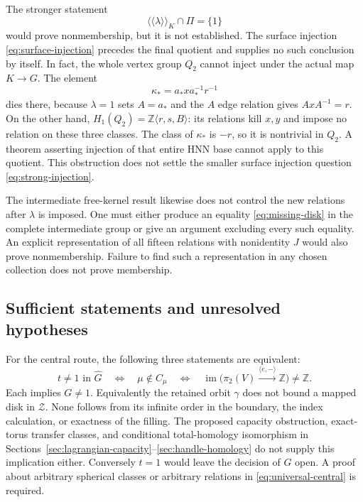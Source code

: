 \documentclass[11pt]{amsart}
\theoremstyle{definition}
\theoremstyle{remark}
\newcommand{\Z}{\mathbb Z}
\newcommand{\nc}[1]{\langle\!\langle #1\rangle\!\rangle}
\begin{document}
The stronger statement
\begin{equation}\label{eq:strong-injection}
                         \nc{\lambda}_K\cap\Pi=\{1\}
\end{equation}
would prove nonmembership, but it is not established. The surface
injection \eqref{eq:surface-injection} precedes the final quotient
and supplies no such conclusion by itself. In fact, the whole
vertex group $Q_2$ cannot inject under the actual map $K\to G$.
The element
\[
                         \kappa_*=a_*xa_*^{-1}r^{-1}
\]
dies there, because $\lambda=1$ sets $A=a_*$ and the $A$ edge
relation gives $AxA^{-1}=r$. On the other hand,
$H_1(Q_2)=\Z\langle r,s,B\rangle$: its relations kill $x,y$
and impose no relation on these three classes. The class of
$\kappa_*$ is $-r$, so it is nontrivial in $Q_2$. A theorem
asserting injection of that entire HNN base cannot apply to this
quotient. This obstruction does not settle the smaller surface
injection question \eqref{eq:strong-injection}.

The intermediate free-kernel result likewise does not control the
new relations after $\lambda$ is imposed. One must either produce
an equality \eqref{eq:missing-disk} in the complete intermediate
group or give an argument excluding every such equality. An explicit
representation of all fifteen relations with nonidentity $J$ would
also prove nonmembership. Failure to find such a representation in
any chosen collection does not prove membership.

\subsection*{Sufficient statements and unresolved hypotheses}
For the central route, the following three statements are equivalent:
\[
 t\ne1\text{ in }\widehat G
 \quad\Longleftrightarrow\quad \mu\notin C_\mu
 \quad\Longleftrightarrow\quad
 \operatorname{im}\bigl(\pi_2(V)\xrightarrow{\langle e,-\rangle}\Z\bigr)
                         \ne\Z.
\]
Each implies $G\ne1$. Equivalently the retained orbit $\gamma$ does
not bound a mapped disk in $\mathcal Z$. None follows from its
infinite order in the boundary, the index calculation, or exactness
of the filling. The proposed capacity obstruction, exact-torus
transfer classes, and conditional total-homology isomorphism in
Sections~\ref{sec:lagrangian-capacity}--\ref{sec:handle-homology}
do not supply this implication either.
Conversely $t=1$ would leave the decision of $G$
open. A proof about arbitrary spherical classes or arbitrary relations
in \eqref{eq:universal-central} is required.
\end{document}

